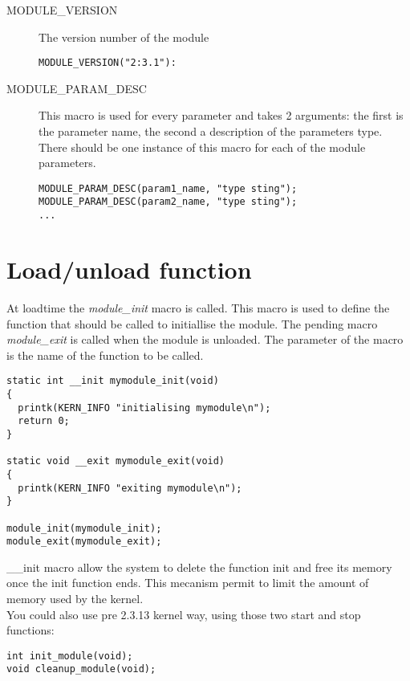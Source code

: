 \documentclass{article}
\begin{document}
\begin{description}
\item[MODULE\_VERSION]
The version number of the module
\begin{lstlisting}
MODULE_VERSION("2:3.1"):
\end{lstlisting}

\item[MODULE\_PARAM\_DESC]
This macro is used for every parameter and takes 2 arguments:
the first is the parameter name, the second a description
of the parameters type. There should be one instance of this
macro for each of the module parameters.
\begin{lstlisting}
MODULE_PARAM_DESC(param1_name, "type sting");
MODULE_PARAM_DESC(param2_name, "type sting");
...
\end{lstlisting}
\end{description}

\section{Load/unload function}
At loadtime the {\it module\_init} macro is called. This macro
is used to define the function that should be called to initiallise
the module. The pending macro {\it module\_exit} is called when the
module is unloaded.
The parameter of the macro is the name of the function to be called.
\begin{lstlisting}
static int __init mymodule_init(void)
{
  printk(KERN_INFO "initialising mymodule\n");
  return 0;
}

static void __exit mymodule_exit(void)
{
  printk(KERN_INFO "exiting mymodule\n");
}

module_init(mymodule_init);
module_exit(mymodule_exit);
\end{lstlisting}
\_\_init macro allow the system to delete the function init and free
its memory once the init function ends.
This mecanism permit to limit the amount of memory used by the kernel.
\\
You could also use pre 2.3.13 kernel way, using those two start and
stop functions:
\begin{lstlisting}
int init_module(void);
void cleanup_module(void);
\end{lstlisting}
\end{document}
